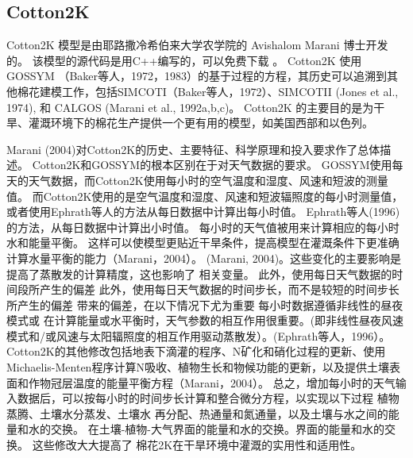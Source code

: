 \subsection{Cotton2K}
Cotton2K 模型是由耶路撒冷希伯来大学农学院的 Avishalom Marani 博士开发的。
该模型的源代码是用C++编写的，可以免费下载 \cite{cotton2kv4}。
Cotton2K 使用 GOSSYM （Baker等人，1972，1983）的基于过程的方程，其历史可以追溯到其他棉花建模工作，包括SIMCOTI（Baker等人，1972）、SIMCOTII (Jones et al., 1974), 和 CALGOS (Marani et al., 1992a,b,c)。
Cotton2K 的主要目的是为干旱、灌溉环境下的棉花生产提供一个更有用的模型，如美国西部和以色列。 

Marani (2004)对Cotton2K的历史、主要特征、科学原理和投入要求作了总体描述。
Cotton2K和GOSSYM的根本区别在于对天气数据的要求。
GOSSYM使用每天的天气数据，而Cotton2K使用每小时的空气温度和湿度、风速和短波的测量值。
而Cotton2K使用的是空气温度和湿度、风速和短波辐照度的每小时测量值，或者使用Ephrath等人的方法从每日数据中计算出每小时值。
Ephrath等人(1996)的方法，从每日数据中计算出小时值。
每小时的天气值被用来计算相应的每小时水和能量平衡。
这样可以使模型更贴近干旱条件，提高模型在灌溉条件下更准确计算水量平衡的能力（Marani，2004）。
(Marani, 2004)。这些变化的主要影响是提高了蒸散发的计算精度，这也影响了 相关变量。
此外，使用每日天气数据的时间段所产生的偏差 此外，使用每日天气数据的时间步长，而不是较短的时间步长所产生的偏差 带来的偏差，在以下情况下尤为重要 每小时数据遵循非线性的昼夜模式或 在计算能量或水平衡时，天气参数的相互作用很重要。(即非线性昼夜风速模式和/或风速与太阳辐照度的相互作用驱动蒸散发）。(Ephrath等人，1996）。
Cotton2K的其他修改包括地表下滴灌的程序、N矿化和硝化过程的更新、使用Michaelis-Menten程序计算N吸收、植物生长和物候功能的更新，以及提供土壤表面和作物冠层温度的能量平衡方程（Marani，2004）。
总之，增加每小时的天气输入数据后，可以按每小时的时间步长计算和整合微分方程，以实现以下过程 植物蒸腾、土壤水分蒸发、土壤水 再分配、热通量和氮通量，以及土壤与水之间的能量和水的交换。
在土壤-植物-大气界面的能量和水的交换。界面的能量和水的交换。
这些修改大大提高了 棉花2K在干旱环境中灌溉的实用性和适用性。

